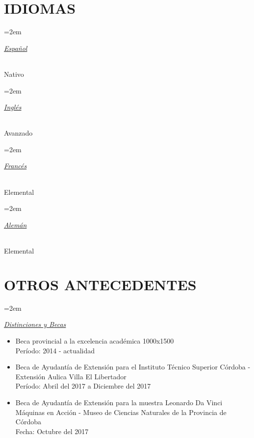 \documentclass[paper=a4,fontsize=11pt]{scrartcl} %
\newlength{\spacebox}
\newcommand{\NewPart}[1]{\section*{\uppercase{#1}}}
\newcommand{\PersonalEntry}[2]{
		\noindent\hangindent=2em\hangafter=0 %
		\parbox{\spacebox}{        %
		\textit{#1}}		       %
		\hspace{1.5em} #2 \par}    %
\newcommand{\SkillsEntry}[2]{      %
		\noindent\hangindent=2em\hangafter=0 %
		\parbox{\spacebox}{        %
		\textit{#1}}			   %
		\hspace{1.5em} #2 \par}    %
\begin{document}
\NewPart{Idiomas}{}

\SkillsEntry{\underline{Español}}{\\Nativo\\}

\SkillsEntry{\underline{Inglés}}{\\Avanzado\\}

\SkillsEntry{\underline{Francés}}{\\Elemental\\}

\SkillsEntry{\underline{Alemán}}{\\Elemental\\}



\newpage

\NewPart{Otros Antecedentes}{}


\SkillsEntry{\underline{Distinciones y Becas}}
{
\begin{itemize}

\item{Beca provincial a la excelencia académica 1000x1500}{ \\ Período: 2014 - actualidad}

\item{Beca de Ayudantía de Extensión para el Instituto Técnico Superior Córdoba - Extensión Aulica Villa El Libertador}{ \\ Período: Abril del 2017 a Diciembre del 2017}

\item{Beca de Ayudantía de Extensión para la muestra Leonardo Da Vinci Máquinas en Acción - Museo de Ciencias Naturales de la Provincia de Córdoba}{ \\ Fecha: Octubre del 2017}

\end{itemize}
}{}
\end{document}

